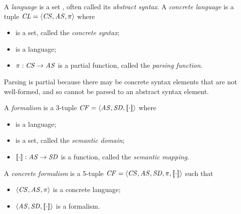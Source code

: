 \begin{newdef}

\begin{Definition}
A \emph{language} is a set \AS, often called its \emph{abstract syntax}. 
A \emph{concrete language} is a tuple $\mathit{CL}=\langle{\ensuremath{\mathit{CS}},\ensuremath{\mathit{AS}},\ensuremath{\pi}}\rangle$ where
\begin{itemize}
\item \CS is a set, called the \emph{concrete syntax};
\item \AS is a language;
\item $\pi:\mathit{CS}\rightarrow\mathit{AS}$ is a partial function, called the \emph{parsing function}.
\end{itemize}
\end{Definition}
%
Parsing is partial because there may be concrete syntax elements that are not well-formed, and so cannot be parsed to an abstract syntax element.
%


\begin{Definition}
A \emph{formalism} is a 3-tuple $\mathit{CF}=\langle{\ensuremath{\mathit{AS}},\ensuremath{\mathit{SD}},[\![{\cdot}]\!]}\rangle$ where
\begin{itemize}
\item \AS is a language;
\item \SD is a set, called the \emph{semantic domain};
\item $[\![{\cdot}]\!]:\mathit{AS}\rightarrow\mathit{SD}$ is a function, called the \emph{semantic mapping}.
\end{itemize}
A \emph{concrete formalism} is a 5-tuple $\mathit{CF}=\langle{\ensuremath{\mathit{CS}},\ensuremath{\mathit{AS}},\ensuremath{\mathit{SD}},\ensuremath{\pi},[\![{\cdot}]\!]}\rangle$ such that
\begin{itemize}
\item $\langle{\ensuremath{\mathit{CS}},\ensuremath{\mathit{AS}},\ensuremath{\pi}}\rangle$ is a concrete language;
\item $\langle{\ensuremath{\mathit{AS}},\ensuremath{\mathit{SD}},[\![{\cdot}]\!]}\rangle$ is a formalism.
\end{itemize}
\end{Definition}



\end{newdef}
